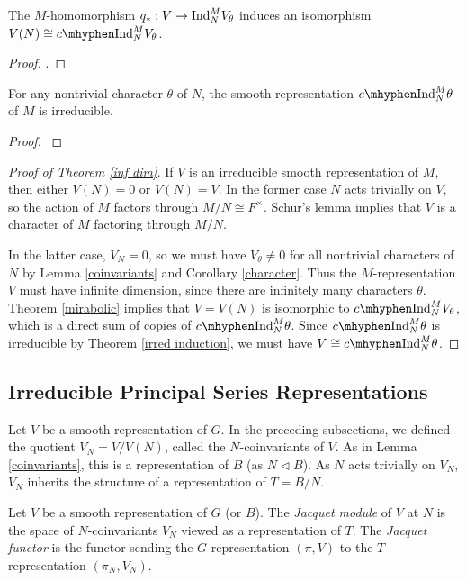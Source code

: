 \begin{thm}\label{mirabolic}
    The $M$-homomorphism $q_*: V \to \mathrm{Ind}_N^M V_\theta$ induces an isomorphism $V(N) \cong \cInd_N^M V_\theta$. 
\end{thm}
\begin{proof}
    \cite[Theorem 8.3]{BH1}.
\end{proof}

\begin{thm}\label{irred induction}
    For any nontrivial character $\theta$ of $N$, the smooth representation $\cInd_N^M \theta$ of $M$ is irreducible. 
\end{thm}
\begin{proof}
    \cite[Corollary 8.2]{BH1}
\end{proof}

\begin{proof}[Proof of Theorem \ref{inf dim}]
    If $V$ is an irreducible smooth representation of $M$, then either $V(N)=0$ or $V(N)=V$. In the former case $N$ acts trivially on $V$, so the action of $M$ factors through $M/N \cong F^\times$. Schur's lemma implies that $V$ is a character of $M$ factoring through $M/N$. 
    
    In the latter case, $V_N=0$, so we must have $V_\theta \neq 0$ for all nontrivial characters of $N$ by Lemma \ref{coinvariants} and Corollary \ref{character}. Thus the $M$-representation $V$ must have infinite dimension, since there are infinitely many characters $\theta$. Theorem \ref{mirabolic} implies that $V = V(N)$ is isomorphic to $\cInd_N^M V_\theta$, which is a direct sum of copies of $\cInd_N^M \theta$. Since $\cInd_N^M \theta$ is irreducible by Theorem \ref{irred induction}, we must have $V\cong \cInd_N^M \theta$. 
\end{proof}




\subsection{Irreducible Principal Series Representations}

Let $V$ be a smooth representation of $G$. In the preceding subsections, we defined the quotient $V_N =V/V(N)$, called the $N$-coinvariants of $V$. As in Lemma \ref{coinvariants}, this is a representation of $B$ (as $N \lhd B$). As $N$ acts trivially on $V_N$, $V_N$ inherits the structure of a representation of $T=B/N$.

\begin{defn}
    Let $V$ be a smooth representation of $G$ (or $B$). The \textit{Jacquet module} of $V$ at $N$ is the space of $N$-coinvariants $V_N$ viewed as a representation of $T$. The \textit{Jacquet functor} is the functor sending the $G$-representation $(\pi,V)$ to the $T$-representation $(\pi_N,V_N)$. 
\end{defn}

